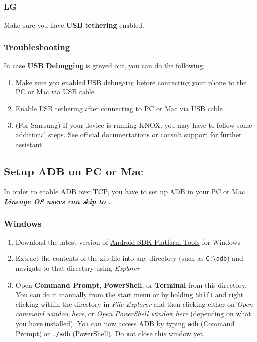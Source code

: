 \subsubsection{LG} %
Make sure you have \textbf{USB tethering} enabled.

\subsubsection{Troubleshooting} %
In case \textbf{USB Debugging} is greyed out, you can do the following:
\begin{enumerate}
    \item Make sure you enabled USB debugging before connecting your phone to the PC or Mac via USB cable
    \item Enable USB tethering after connecting to PC or Mac via USB cable
    \item (For Samsung) If your device is running KNOX, you may have to follow some additional steps. See official
    documentations or consult support for further assistant
\end{enumerate}

\subsection{Setup ADB on PC or Mac}\label{subsec:setup-adb-on-pc-or-mac} %
In order to enable ADB over TCP, you have to set up ADB in your PC or Mac. \textbf{\textit{Lineage OS users can skip to
.}}

\subsubsection{Windows} %
\begin{enumerate}
    \item Download the latest version of
    \href{https://dl.google.com/android/repository/platform-tools-latest-windows.zip}{Android SDK Platform-Tools} for
    Windows
    \item Extract the contents of the zip file into any directory (such as \texttt{C:\textbackslash{adb}}) and navigate
    to that directory using \textit{Explorer}
    \item Open \textbf{Command Prompt}, \textbf{PowerShell}, or \textbf{Terminal} from this directory.
    You can do it manually from the start menu or by holding \texttt{Shift} and right clicking within
    the directory in \textit{File Explorer} and then clicking either on \textit{Open command window here},
    or \textit{Open PowerShell window here} (depending on what you have installed). You can now
    access ADB by typing \texttt{adb} (Command Prompt) or \texttt{./adb} (PowerShell).
    Do not close this window yet.
\end{enumerate}


